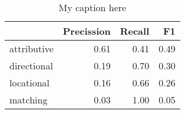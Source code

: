 \begin{table}[!ht]
\centering
\begin{tabular}{lrrr}
\toprule
{} &  Precission &  Recall &   F1 \\
\midrule
attributive &        0.61 &    0.41 & 0.49 \\
directional &        0.19 &    0.70 & 0.30 \\
locational  &        0.16 &    0.66 & 0.26 \\
matching    &        0.03 &    1.00 & 0.05 \\
\bottomrule
\end{tabular}
\caption{My caption here}
\label{tab:RELATIONAL-oe-combined-F1}
\end{table}